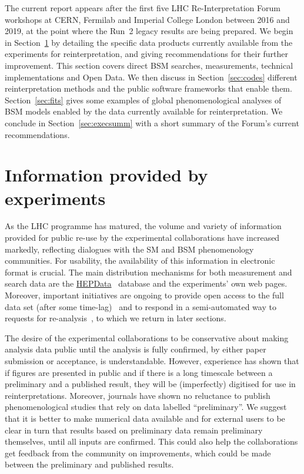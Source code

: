 \documentclass[a4paper,aps,prd,longbibliography,notitlepage,showpacs,amsmath,amssymb,superscriptaddress,nofootinbib,floatfix,11pt,preprintnumbers]{revtex4-1-mod}
\newcommand{\hepdata}{\textsf{HEPData}\xspace}
\begin{document}
The current report appears after the first five LHC Re-Interpretation Forum workshops at CERN, Fermilab and Imperial College London between 2016 and 2019, at the point where the Run~2 legacy results are being prepared.
We begin in Section~\ref{sec:data} by detailing the specific data products currently available from the experiments for reinterpretation, and giving recommendations for their further improvement. This section covers direct BSM searches, measurements, technical implementations and Open Data.
We then discuss in Section~\ref{sec:codes} different reinterpretation methods and the public software frameworks that enable them.
Section~\ref{sec:fits} gives some examples of global phenomenological analyses of BSM models enabled by the data currently available for reinterpretation.
We conclude in Section~\ref{sec:execsumm} with a short summary of the Forum's current recommendations.


\section{Information provided by experiments} \label{sec:data}

As the LHC programme has matured, the volume and variety of information provided for public re-use by the experimental collaborations have increased markedly, reflecting dialogues with the SM and BSM phenomenology  communities. For usability, the availability of this information in electronic format is crucial.
The main distribution mechanisms for both measurement and search data are the \href{https://www.hepdata.net/}{\hepdata}~\cite{HEPDATA} database and the experiments' own web pages.  Moreover, important initiatives are ongoing to provide open access to the full data set (after some time-lag)~\cite{OpenDataPortal,CMSOpenDataPolicy} and to respond in a semi-automated way to requests for re-analysis~\cite{RECAST}, to which we return in later sections.

The desire of the experimental collaborations to be conservative about making analysis data public until the analysis is fully confirmed, by either paper submission or acceptance, is understandable. However, experience has shown that if figures are presented in public and if there is a long timescale between a preliminary and a published result, they will be (imperfectly) digitised for use in reinterpretations. Moreover, journals have shown no reluctance to publish phenomenological
studies that rely on data labelled ``preliminary''.
We suggest that it is better to make numerical data available and for external users to be clear in turn that results based on preliminary data remain preliminary themselves, until all inputs are confirmed. This could also help the collaborations get feedback from the community on improvements, which could be made between the preliminary and published results.
\end{document}
